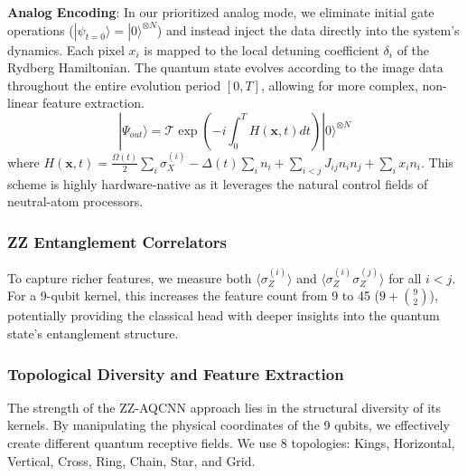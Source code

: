 \documentclass{oqireport}
\begin{document}
\textbf{Analog Encoding}: In our prioritized analog mode, we eliminate initial gate operations ($|\psi_{t=0}\rangle = |0\rangle^{\otimes N}$) and instead inject the data directly into the system's dynamics. Each pixel $x_i$ is mapped to the local detuning coefficient $\delta_i$ of the Rydberg Hamiltonian. The quantum state evolves according to the image data throughout the entire evolution period $[0, T]$, allowing for more complex, non-linear feature extraction.
\begin{equation}
|\Psi_{out}\rangle = \mathcal{T} \exp \left( -i \int_0^T H(\mathbf{x}, t) dt \right) |0\rangle^{\otimes N}
\end{equation}
where $H(\mathbf{x}, t) = \frac{\Omega(t)}{2} \sum_i \sigma_X^{(i)} - \Delta(t) \sum_i n_i + \sum_{i<j} J_{ij} n_i n_j + \sum_i x_i n_i$. This scheme is highly hardware-native as it leverages the natural control fields of neutral-atom processors.

\subsubsection{ZZ Entanglement Correlators}
To capture richer features, we measure both $\langle \sigma_Z^{(i)} \rangle$ and $\langle \sigma_Z^{(i)} \sigma_Z^{(j)} \rangle$ for all $i < j$. For a 9-qubit kernel, this increases the feature count from 9 to 45 ($9 + \binom{9}{2}$), potentially providing the classical head with deeper insights into the quantum state's entanglement structure.

\subsubsection{Topological Diversity and Feature Extraction}
The strength of the ZZ-AQCNN approach lies in the structural diversity of its kernels. By manipulating the physical coordinates of the 9 qubits, we effectively create different quantum receptive fields. We use 8 topologies: Kings, Horizontal, Vertical, Cross, Ring, Chain, Star, and Grid.
\end{document}
